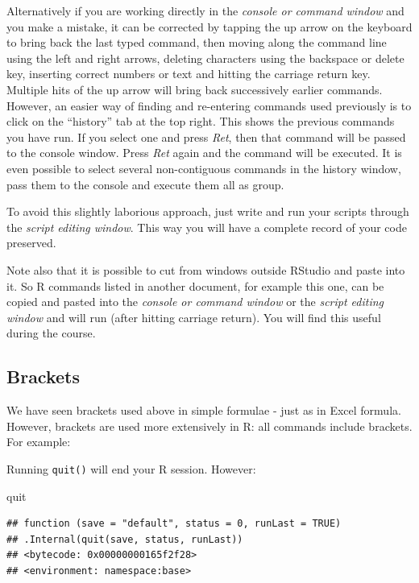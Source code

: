 \documentclass[
]{book}
\makeatletter
\newenvironment{Shaded}{\begin{snugshade}}{\end{snugshade}}
\newcommand{\NormalTok}[1]{#1}
\newenvironment{kframe}{%
\medskip{}
\setlength{\fboxsep}{.8em}
 \def\at@end@of@kframe{}%
 \ifinner\ifhmode%
  \def\at@end@of@kframe{\end{minipage}}%
  \begin{minipage}{\columnwidth}%
 \fi\fi%
 \def\FrameCommand##1{\hskip\@totalleftmargin \hskip-\fboxsep
 \colorbox{shadecolor}{##1}\hskip-\fboxsep
     \hskip-\linewidth \hskip-\@totalleftmargin \hskip\columnwidth}%
 \MakeFramed {\advance\hsize-\width
   \@totalleftmargin\z@ \linewidth\hsize
   \@setminipage}}%
 {\par\unskip\endMakeFramed%
 \at@end@of@kframe}
\newenvironment{rmdblock}[1]
  {
  \begin{itemize}
  \renewcommand{\labelitemi}{
    \raisebox{-.7\height}[0pt][0pt]{
      {\setkeys{Gin}{width=3em,keepaspectratio}\texttt{[image: images/\#1]}}
    }
  }
  \setlength{\fboxsep}{1em}
  \begin{kframe}
  \item
  }
  {
  \end{kframe}
  \end{itemize}
  }
\newenvironment{rmdnote}
  {\begin{rmdblock}{note}}
  {\end{rmdblock}}
\makeatother
\begin{document}
Alternatively if you are working directly in the \emph{console or command window} and you make a mistake, it can be corrected by tapping the up arrow on the keyboard to bring back the last typed command, then moving along the command line using the left and right arrows, deleting characters using the backspace or delete key, inserting correct numbers or text and hitting the carriage return key. Multiple hits of the up arrow will bring back successively earlier commands. However, an easier way of finding and re-entering commands used previously is to click on the ``history'' tab at the top right. This shows the previous commands you have run. If you select one and press \emph{Ret}, then that command will be passed to the console window. Press \emph{Ret} again and the command will be executed. It is even possible to select several non-contiguous commands in the history window, pass them to the console and execute them all as group.

To avoid this slightly laborious approach, just write and run your scripts through the \emph{script editing window}. This way you will have a complete record of your code preserved.

\begin{rmdnote}
Note also that it is possible to cut from windows outside RStudio and paste into it. So R commands listed in another document, for example this one, can be copied and pasted into the \emph{console or command window} or the \emph{script editing window} and will run (after hitting carriage return). You will find this useful during the course.
\end{rmdnote}

\hypertarget{brackets}{%
\subsection{Brackets}\label{brackets}}

We have seen brackets used above in simple formulae - just as in Excel formula. However, brackets are used more extensively in R: all commands include brackets. For example:

Running \texttt{quit()} will end your R session. However:

\begin{Shaded}
\begin{Highlighting}[]
\NormalTok{quit}
\end{Highlighting}
\end{Shaded}

\begin{verbatim}
## function (save = "default", status = 0, runLast = TRUE) 
## .Internal(quit(save, status, runLast))
## <bytecode: 0x00000000165f2f28>
## <environment: namespace:base>
\end{verbatim}
\end{document}
